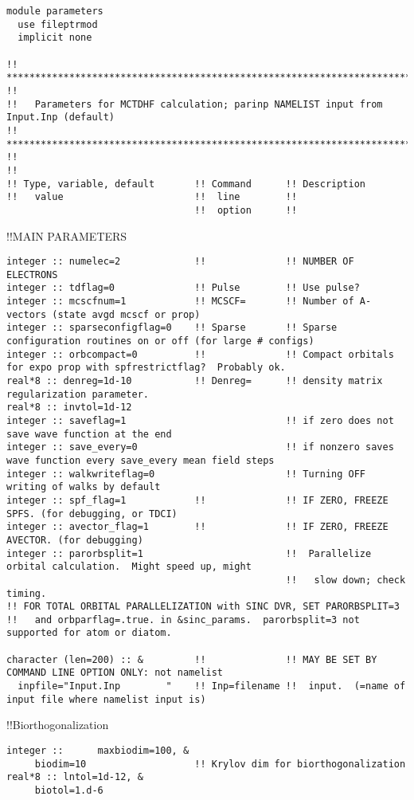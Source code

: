 \begin{verbatim}
module parameters
  use fileptrmod
  implicit none

!! *********************************************************************************************************** !!
!!   Parameters for MCTDHF calculation; parinp NAMELIST input from Input.Inp (default)
!! *********************************************************************************************************** !!
!!
!! Type, variable, default       !! Command      !! Description 
!!   value                       !!  line        !! 
                                 !!  option      !!
\end{verbatim}
!!{\large \quad MAIN PARAMETERS }
\begin{verbatim}
integer :: numelec=2             !!              !! NUMBER OF ELECTRONS
integer :: tdflag=0              !! Pulse        !! Use pulse?
integer :: mcscfnum=1            !! MCSCF=       !! Number of A-vectors (state avgd mcscf or prop)
integer :: sparseconfigflag=0    !! Sparse       !! Sparse configuration routines on or off (for large # configs)
integer :: orbcompact=0          !!              !! Compact orbitals for expo prop with spfrestrictflag?  Probably ok.
real*8 :: denreg=1d-10           !! Denreg=      !! density matrix regularization parameter.
real*8 :: invtol=1d-12
integer :: saveflag=1                            !! if zero does not save wave function at the end
integer :: save_every=0                          !! if nonzero saves wave function every save_every mean field steps
integer :: walkwriteflag=0                       !! Turning OFF writing of walks by default
integer :: spf_flag=1            !!              !! IF ZERO, FREEZE SPFS. (for debugging, or TDCI)
integer :: avector_flag=1        !!              !! IF ZERO, FREEZE AVECTOR. (for debugging)
integer :: parorbsplit=1                         !!  Parallelize orbital calculation.  Might speed up, might
                                                 !!   slow down; check timing.
!! FOR TOTAL ORBITAL PARALLELIZATION with SINC DVR, SET PARORBSPLIT=3
!!   and orbparflag=.true. in &sinc_params.  parorbsplit=3 not supported for atom or diatom.

character (len=200) :: &         !!              !! MAY BE SET BY COMMAND LINE OPTION ONLY: not namelist
  inpfile="Input.Inp        "    !! Inp=filename !!  input.  (=name of input file where namelist input is)
\end{verbatim}
!!{\large \quad Biorthogonalization }
\begin{verbatim}
integer ::      maxbiodim=100, &
     biodim=10                   !! Krylov dim for biorthogonalization
real*8 :: lntol=1d-12, &
     biotol=1.d-6
\end{verbatim}
